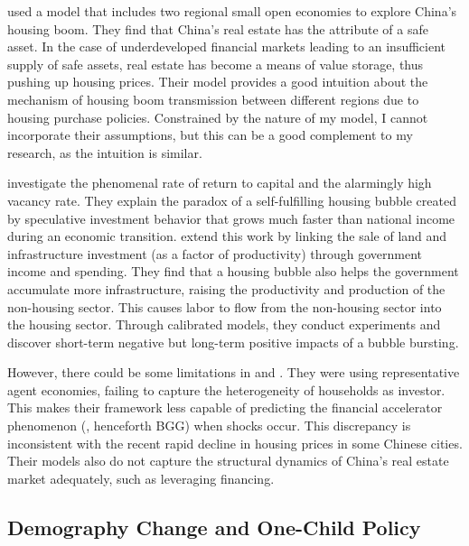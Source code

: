\documentclass[12pt,english]{article}
\begin{document}
	\cite{luo2023shortage} used a model that includes two regional small open economies to explore China's housing boom. They find that China's real estate has the attribute of a safe asset. In the case of underdeveloped financial markets leading to an insufficient supply of safe assets, real estate has become a means of value storage, thus pushing up housing prices. Their model provides a good intuition about the mechanism of housing boom transmission between different regions due to housing purchase policies. Constrained by the nature of my model, I cannot incorporate their assumptions, but this can be a good complement to my research, as the intuition is similar.
	
	\cite{chen2017great} investigate the phenomenal rate of return to capital and the alarmingly high vacancy rate. They explain the paradox of a self-fulfilling housing bubble created by speculative investment behavior that grows much faster than national income during an economic transition. \cite{jiang2022china} extend this work by linking the sale of land and infrastructure investment (as a factor of productivity) through government income and spending. They find that a housing bubble also helps the government accumulate more infrastructure, raising the productivity and production of the non-housing sector. This causes labor to flow from the non-housing sector into the housing sector. Through calibrated models, they conduct experiments and discover short-term negative but long-term positive impacts of a bubble bursting.
	
	However, there could be some limitations in \cite{chen2017great}  and \cite{jiang2022china}. They were using representative agent economies, failing to capture the heterogeneity of households as investor. This makes their framework less capable of predicting the financial accelerator phenomenon (\citealp{bernanke1999financial}, henceforth BGG) when shocks occur. This discrepancy is inconsistent with the recent rapid decline in housing prices in some Chinese cities. Their models also do not capture the structural dynamics of China's real estate market adequately, such as leveraging financing.
	
	\subsection{Demography Change and One-Child Policy}
	
\end{document}
